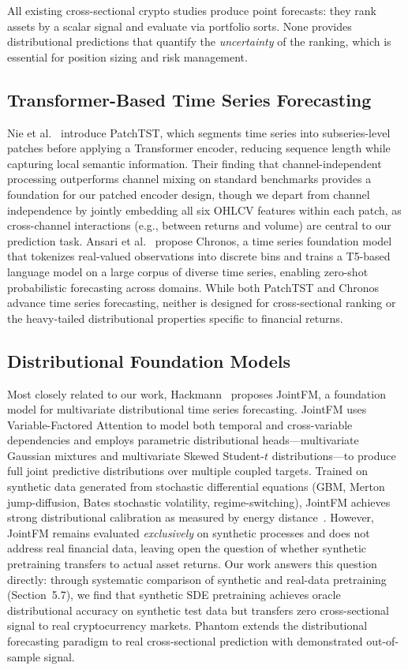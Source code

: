 \documentclass[sigconf]{acmart}
\begin{document}
All existing cross-sectional crypto studies produce point forecasts: they rank assets by a scalar signal and evaluate via portfolio sorts.
None provides distributional predictions that quantify the \emph{uncertainty} of the ranking, which is essential for position sizing and risk management.

\subsection{Transformer-Based Time Series Forecasting}

Nie et al.~\cite{nie2023} introduce PatchTST, which segments time series into subseries-level patches before applying a Transformer encoder, reducing sequence length while capturing local semantic information.
Their finding that channel-independent processing outperforms channel mixing on standard benchmarks provides a foundation for our patched encoder design, though we depart from channel independence by jointly embedding all six OHLCV features within each patch, as cross-channel interactions (e.g., between returns and volume) are central to our prediction task.
Ansari et al.~\cite{ansari2024} propose Chronos, a time series foundation model that tokenizes real-valued observations into discrete bins and trains a T5-based language model on a large corpus of diverse time series, enabling zero-shot probabilistic forecasting across domains.
While both PatchTST and Chronos advance time series forecasting, neither is designed for cross-sectional ranking or the heavy-tailed distributional properties specific to financial returns.

\subsection{Distributional Foundation Models}

Most closely related to our work, Hackmann~\cite{hackmann2026} proposes JointFM, a foundation model for multivariate distributional time series forecasting.
JointFM uses Variable-Factored Attention to model both temporal and cross-variable dependencies and employs parametric distributional heads---multivariate Gaussian mixtures and multivariate Skewed Student-$t$ distributions---to produce full joint predictive distributions over multiple coupled targets.
Trained on synthetic data generated from stochastic differential equations (GBM, Merton jump-diffusion, Bates stochastic volatility, regime-switching), JointFM achieves strong distributional calibration as measured by energy distance~\cite{szekely2013}.
However, JointFM remains evaluated \emph{exclusively} on synthetic processes and does not address real financial data, leaving open the question of whether synthetic pretraining transfers to actual asset returns.
Our work answers this question directly: through systematic comparison of synthetic and real-data pretraining (Section~5.7), we find that synthetic SDE pretraining achieves oracle distributional accuracy on synthetic test data but transfers zero cross-sectional signal to real cryptocurrency markets.
Phantom extends the distributional forecasting paradigm to real cross-sectional prediction with demonstrated out-of-sample signal.
\end{document}
